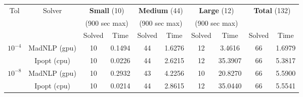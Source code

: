 \begin{tabular}{|c|c|cc|cc|cc|cc|}
  \hline
  \multirow{ 3}{*}{Tol} & \multirow{ 3}{*}{Solver} & \multicolumn{2}{c|}{\textbf{Small} (10)}& \multicolumn{2}{c|}{\textbf{Medium} (44)}& \multicolumn{2}{c|}{\textbf{Large} (12)}& \multicolumn{2}{c|}{\multirow{2}{*}{\textbf{Total} (132)}}\\
                        && \multicolumn{2}{c|}{(900 sec max)}& \multicolumn{2}{c|}{(900 sec max)}& \multicolumn{2}{c|}{(900 sec max)}&&\\
                        &&  Solved & Time &  Solved & Time &  Solved & Time &  Solved & Time \\
  \hline
    \multirow{2}{*}{$10^{-4}$} & MadNLP (gpu) & 10 & 0.1494 & 44 & 1.6276 & 12 & 3.4616 & 66 & 1.6979  \\
                        & Ipopt (cpu) & 10 & 0.0226 & 44 & 2.6215 & 12 & 35.3907 & 66 & 5.3817  \\

  \hline
    \multirow{2}{*}{$10^{-8}$} & MadNLP (gpu) & 10 & 0.2932 & 43 & 4.2256 & 10 & 20.8270 & 66 & 5.5900  \\
                        & Ipopt (cpu) & 10 & 0.0214 & 44 & 2.8615 & 12 & 35.0440 & 66 & 5.5541  \\

  \hline
\end{tabular}
